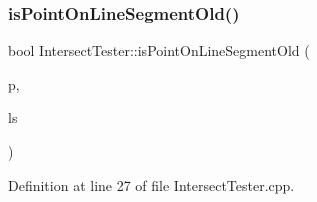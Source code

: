 \mbox{\label{class_intersect_tester_af4b47b5b70e769205f6b113cb054f961}} 
\subsubsection{\texorpdfstring{is\+Point\+On\+Line\+Segment\+Old()}{isPointOnLineSegmentOld()}}
{\footnotesize\ttfamily bool Intersect\+Tester\+::is\+Point\+On\+Line\+Segment\+Old (\begin{DoxyParamCaption}\item[{\hyperlink{class_point}{Point}}]{p,  }\item[{\hyperlink{class_line_segment}{Line\+Segment}}]{ls }\end{DoxyParamCaption})\hspace{0.3cm}{\ttfamily [private]}}



Definition at line 27 of file Intersect\+Tester.\+cpp.


